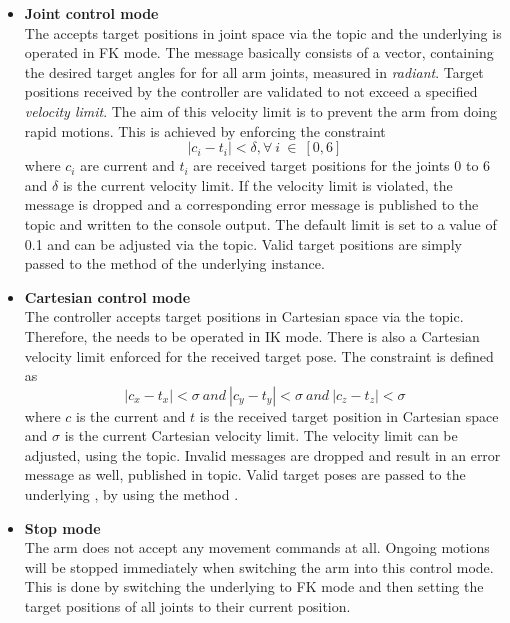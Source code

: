 \begin{itemize}

\item \textbf{Joint control mode} \\
The  accepts target positions in joint space via the  topic and the underlying  is operated in FK mode. The message basically consists of a vector, containing the desired target angles for for all arm joints, measured in \emph{radiant}. Target positions received by the controller are validated to not exceed a specified \emph{velocity limit}. The aim of this velocity limit is to prevent the arm from doing rapid motions. This is achieved by enforcing the constraint
\begin{equation}
  |c_{i}-t_{i}|<\delta, \forall ~i~\in~[0,6]
\end{equation}
where $c_{i}$ are current and $t_{i}$ are received target positions for the joints 0 to 6 and $\delta$ is the current velocity limit. If the velocity limit is violated, the message is dropped and a corresponding error message is published to the  topic and written to the console output. The default limit is set to a value of 0.1 and can be adjusted via the  topic. Valid target positions are simply passed to the  method of the underlying  instance.

\item \textbf{Cartesian control mode} \\
The controller accepts target positions in Cartesian space via the  topic. Therefore, the  needs to be operated in IK mode. There is also a Cartesian velocity limit enforced for the received target pose. The constraint is defined as
\begin{equation}
  |c_{x}-t_{x}|<\sigma ~and~ |c_{y}-t_{y}|<\sigma ~and~ |c_{z}-t_{z}|<\sigma
\end{equation}
where $c$ is the current and $t$ is the received target position in Cartesian space and $\sigma$ is the current Cartesian velocity limit. The velocity limit can be adjusted, using the  topic. Invalid messages are dropped and result in an error message as well, published in  topic. Valid target poses are passed to the underlying , by using the method .

\item \textbf{Stop mode} \\
The arm does not accept any movement commands at all. Ongoing motions will be stopped immediately when switching the arm into this control mode. This is done by switching the underlying  to FK mode and then setting the target positions of all joints to their current position.


\end{itemize}
